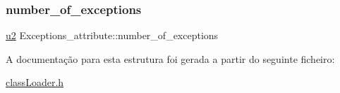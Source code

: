 \mbox{\label{struct_exceptions__attribute_af9f38fbc43eadcb56658f90e8743c90b}} 
\subsubsection{\texorpdfstring{number\+\_\+of\+\_\+exceptions}{number\_of\_exceptions}}
{\footnotesize\ttfamily \hyperlink{util_8h_a55ef8d87fd202b8417704c089899c5b9}{u2} Exceptions\+\_\+attribute\+::number\+\_\+of\+\_\+exceptions}



A documentação para esta estrutura foi gerada a partir do seguinte ficheiro\+:\begin{DoxyCompactItemize}
\item 
\hyperlink{class_loader_8h}{class\+Loader.\+h}\end{DoxyCompactItemize}
